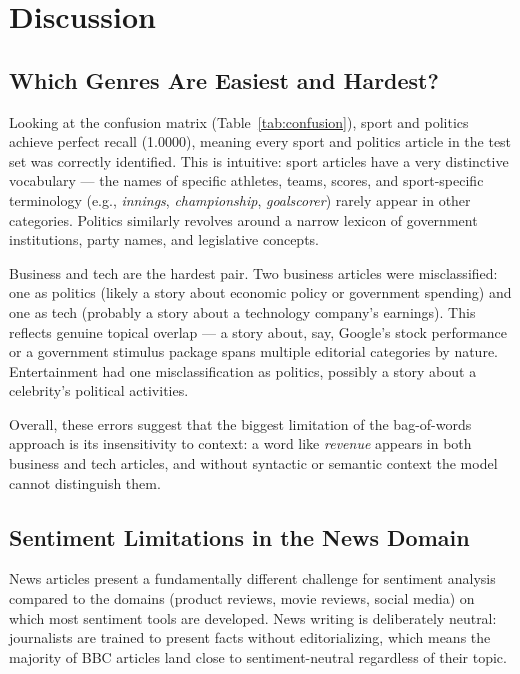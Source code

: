 \section{Discussion}
\label{sec:discussion}

\subsection{Which Genres Are Easiest and Hardest?}

Looking at the confusion matrix (Table~\ref{tab:confusion}), sport and politics achieve perfect recall (1.0000), meaning every sport and politics article in the test set was correctly identified. This is intuitive: sport articles have a very distinctive vocabulary — the names of specific athletes, teams, scores, and sport-specific terminology (e.g., \textit{innings}, \textit{championship}, \textit{goalscorer}) rarely appear in other categories. Politics similarly revolves around a narrow lexicon of government institutions, party names, and legislative concepts.

Business and tech are the hardest pair. Two business articles were misclassified: one as politics (likely a story about economic policy or government spending) and one as tech (probably a story about a technology company's earnings). This reflects genuine topical overlap — a story about, say, Google's stock performance or a government stimulus package spans multiple editorial categories by nature. Entertainment had one misclassification as politics, possibly a story about a celebrity's political activities.

Overall, these errors suggest that the biggest limitation of the bag-of-words approach is its insensitivity to context: a word like \textit{revenue} appears in both business and tech articles, and without syntactic or semantic context the model cannot distinguish them.

\subsection{Sentiment Limitations in the News Domain}

News articles present a fundamentally different challenge for sentiment analysis compared to the domains (product reviews, movie reviews, social media) on which most sentiment tools are developed. News writing is deliberately neutral: journalists are trained to present facts without editorializing, which means the majority of BBC articles land close to sentiment-neutral regardless of their topic.


